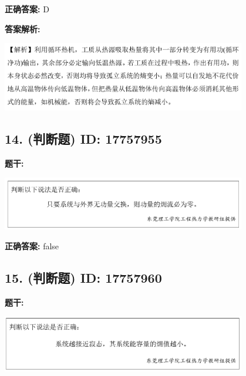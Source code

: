 \documentclass[12pt]{article}
\begin{document}
\textbf{正确答案:}
D

\textbf{答案解析:}


\begin{center}\includegraphics[width=0.8\textwidth, height=0.25\textheight, keepaspectratio]{question_13_17757940/correct_replay_img_1.png}\end{center}

\vspace{0.5em}\hrulefill\vspace{1em}

\subsection*{14. (判断题) \small ID: 17757955}

\textbf{题干:}


\begin{center}\includegraphics[width=0.8\textwidth, height=0.25\textheight, keepaspectratio]{question_14_17757955/title_img_1.png}\end{center}

\textbf{正确答案:}
false

\vspace{0.5em}\hrulefill\vspace{1em}

\subsection*{15. (判断题) \small ID: 17757960}

\textbf{题干:}


\begin{center}\includegraphics[width=0.8\textwidth, height=0.25\textheight, keepaspectratio]{question_15_17757960/title_img_1.png}\end{center}
\end{document}
